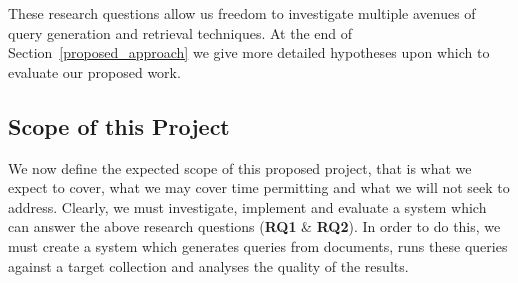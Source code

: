 \documentclass{mprop}
\begin{document}
These research questions allow us freedom to investigate multiple avenues of query generation and retrieval techniques. At the end of Section~\ref{proposed_approach} we give more detailed hypotheses upon which to evaluate our proposed work.


\subsection{Scope of this Project}
We now define the expected scope of this proposed project, that is what we expect to cover, what we may cover time permitting and what we will not seek to address. Clearly, we must investigate, implement and evaluate a system which can answer the above research questions (\textbf{RQ1} \& \textbf{RQ2}). In order to do this, we must create a system which generates queries from documents, runs these queries against a target collection and analyses the quality of the results.
\end{document}
